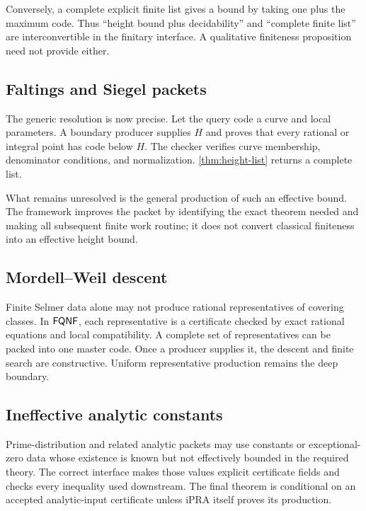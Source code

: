 Conversely, a complete explicit finite list gives a bound by taking one plus
the maximum code.  Thus ``height bound plus decidability'' and ``complete
finite list'' are interconvertible in the finitary interface.  A qualitative
finiteness proposition need not provide either.

\subsection{Faltings and Siegel packets}

The generic resolution is now precise.  Let the query code a curve and local
parameters.  A boundary producer supplies \(H\) and proves that every rational
or integral point has code below \(H\).  The checker verifies curve membership,
denominator conditions, and normalization.  \cref{thm:height-list} returns a
complete list.

What remains unresolved is the general production of such an effective bound.
The framework improves the packet by identifying the exact theorem needed and
making all subsequent finite work routine; it does not convert classical
finiteness into an effective height bound.

\subsection{Mordell--Weil descent}

Finite Selmer data alone may not produce rational representatives of covering
classes.  In \(\mathsf{FQNF}\), each representative is a certificate checked by exact
rational equations and local compatibility.  A complete set of representatives
can be packed into one master code.  Once a producer supplies it, the descent
and finite search are constructive.  Uniform representative production remains
the deep boundary.

\subsection{Ineffective analytic constants}

Prime-distribution and related analytic packets may use constants or
exceptional-zero data whose existence is known but not effectively bounded in
the required theory.  The correct interface makes those values explicit
certificate fields and checks every inequality used downstream.  The final
theorem is conditional on an accepted analytic-input certificate unless iPRA
itself proves its production.

